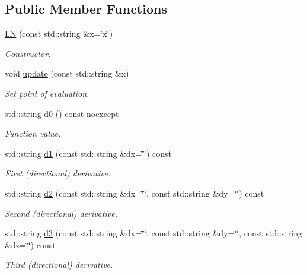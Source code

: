 \subsection*{Public Member Functions}
\begin{DoxyCompactItemize}
\item 
\hyperlink{structFunG_1_1stringify_1_1LN_afc40ce98f8471c068528b104eae47e7b}{L\-N} (const std\-::string \&x=\char`\"{}x\char`\"{})
\begin{DoxyCompactList}\small\item\em Constructor. \end{DoxyCompactList}\item 
void \hyperlink{structFunG_1_1stringify_1_1LN_a6d40e57ef283062964391a11eba53609}{update} (const std\-::string \&x)
\begin{DoxyCompactList}\small\item\em Set point of evaluation. \end{DoxyCompactList}\item 
std\-::string \hyperlink{structFunG_1_1stringify_1_1LN_a39413d0f3882abec38723391a4c6b41e}{d0} () const noexcept
\begin{DoxyCompactList}\small\item\em Function value. \end{DoxyCompactList}\item 
std\-::string \hyperlink{structFunG_1_1stringify_1_1LN_a131b3f8fb515f5338e58a4813ccecded}{d1} (const std\-::string \&dx=\char`\"{}\char`\"{}) const 
\begin{DoxyCompactList}\small\item\em First (directional) derivative. \end{DoxyCompactList}\item 
std\-::string \hyperlink{structFunG_1_1stringify_1_1LN_a94b2503128030955c03d3298b6e1a5c7}{d2} (const std\-::string \&dx=\char`\"{}\char`\"{}, const std\-::string \&dy=\char`\"{}\char`\"{}) const 
\begin{DoxyCompactList}\small\item\em Second (directional) derivative. \end{DoxyCompactList}\item 
std\-::string \hyperlink{structFunG_1_1stringify_1_1LN_a312dc493d620c8f2ceabc7719b257b48}{d3} (const std\-::string \&dx=\char`\"{}\char`\"{}, const std\-::string \&dy=\char`\"{}\char`\"{}, const std\-::string \&dz=\char`\"{}\char`\"{}) const 
\begin{DoxyCompactList}\small\item\em Third (directional) derivative. \end{DoxyCompactList}\end{DoxyCompactItemize}


